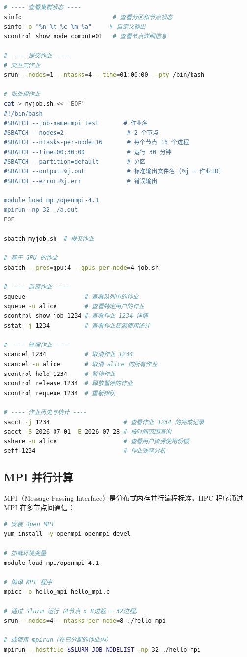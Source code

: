 \documentclass[12pt,UTF8]{ctexbook}
\begin{document}
\begin{lstlisting}[language=bash]
# ---- 查看集群状态 ----
sinfo                          # 查看分区和节点状态
sinfo -o "%n %t %c %m %a"     # 自定义输出
scontrol show node compute01   # 查看节点详细信息

# ---- 提交作业 ----
# 交互式作业
srun --nodes=1 --ntasks=4 --time=01:00:00 --pty /bin/bash

# 批处理作业
cat > myjob.sh << 'EOF'
#!/bin/bash
#SBATCH --job-name=mpi_test       # 作业名
#SBATCH --nodes=2                  # 2 个节点
#SBATCH --ntasks-per-node=16       # 每个节点 16 个进程
#SBATCH --time=00:30:00            # 运行 30 分钟
#SBATCH --partition=default        # 分区
#SBATCH --output=%j.out            # 标准输出文件名 (%j = 作业ID)
#SBATCH --error=%j.err             # 错误输出

module load mpi/openmpi-4.1
mpirun -np 32 ./a.out
EOF

sbatch myjob.sh  # 提交作业

# 基于 GPU 的作业
sbatch --gres=gpu:4 --gpus-per-node=4 job.sh

# ---- 监控作业 ----
squeue                 # 查看队列中的作业
squeue -u alice        # 查看特定用户的作业
scontrol show job 1234 # 查看作业 1234 详情
sstat -j 1234          # 查看作业资源使用统计

# ---- 管理作业 ----
scancel 1234           # 取消作业 1234
scancel -u alice       # 取消 alice 的所有作业
scontrol hold 1234     # 暂停作业
scontrol release 1234  # 释放暂停的作业
scontrol requeue 1234  # 重新排队

# ---- 作业历史与统计 ----
sacct -j 1234                     # 查看作业 1234 的完成记录
sacct -S 2026-07-01 -E 2026-07-28 # 按时间范围查询
sshare -u alice                   # 查看用户资源使用份额
seff 1234                         # 作业效率分析
\end{lstlisting}

\subsection{MPI 并行计算}

MPI（Message Passing Interface）是分布式内存并行编程标准，HPC 程序通过 MPI 在多节点间通信：

\begin{lstlisting}[language=bash]
# 安装 Open MPI
yum install -y openmpi openmpi-devel

# 加载环境变量
module load mpi/openmpi-4.1

# 编译 MPI 程序
mpicc -o hello_mpi hello_mpi.c

# 通过 Slurm 运行（4节点 x 8进程 = 32进程）
srun --nodes=4 --ntasks-per-node=8 ./hello_mpi

# 或使用 mpirun（在已分配的作业内）
mpirun --hostfile $SLURM_JOB_NODELIST -np 32 ./hello_mpi
\end{lstlisting}
\end{document}
